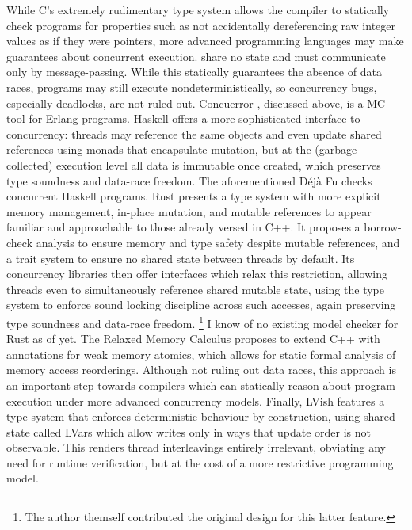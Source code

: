 While C's extremely rudimentary type system allows the compiler to statically check programs
for properties such as not accidentally dereferencing raw integer values as if they were pointers,
more advanced programming languages may make guarantees about concurrent execution.
%
 share no state and must communicate only by message-passing.
While this statically guarantees the absence of data races,
programs may still execute nondeterministically,
so concurrency bugs, especially deadlocks, are not ruled out.
Concuerror \cite{concuerror}, discussed above, is a MC tool for Erlang programs.
%
Haskell \cite{haskell} offers a more sophisticated interface to concurrency:
threads may reference the same objects and even update shared references
using monads that encapsulate mutation,
but at the (garbage-collected) execution level all data is immutable once created,
which preserves type soundness and data-race freedom.
The aforementioned D\'{e}j\`{a} Fu \cite{dejafu} checks concurrent Haskell programs.
%
Rust \cite{rust-language}
presents a type system with more explicit memory management,
in-place mutation,
and mutable references
to appear familiar and approachable to those already versed in C++.
It proposes a borrow-check analysis to ensure memory and type safety
despite mutable references,
and a trait system to ensure no shared state between threads by default.
Its concurrency libraries then offer interfaces which relax this restriction,
allowing threads even to simultaneously reference shared mutable state,
using the type system to enforce sound locking discipline across such accesses,
again preserving type soundness and data-race freedom.%
\footnote{The author themself contributed the original design for this latter feature.}
I know of no existing model checker for Rust as of yet.
%
The Relaxed Memory Calculus \cite{sully-thesis}
proposes to extend C++ with annotations for weak memory atomics,
which allows for static formal analysis of memory access reorderings.
Although not ruling out data races,
this approach is an important step towards compilers
which can statically reason about program execution under more advanced concurrency models.
%
Finally, LVish \cite{lvish}
features a type system that enforces deterministic behaviour by construction,
using shared state called LVars which allow writes only in ways that update order is not observable.
This renders thread interleavings entirely irrelevant,
obviating any need for runtime verification,
but at the cost of a more restrictive programming model.

